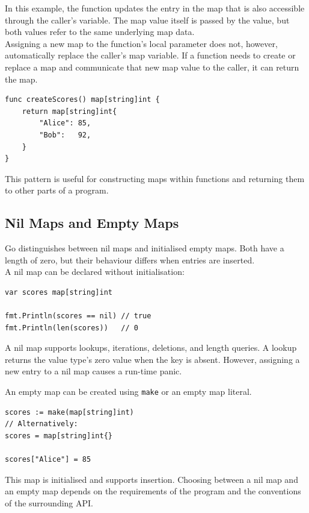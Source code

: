 In this example, the function updates the entry in the
map that is also accessible through the caller's variable.
The map value itself is passed by the value, but both values
refer to the same underlying map data.\\

Assigning a new map to the function's local parameter
does not, however, automatically replace the caller's
map variable. If a function needs to create or replace
a map and communicate that new map value to the caller,
it can return the map.

\begin{lstlisting}
func createScores() map[string]int {
    return map[string]int{
        "Alice": 85,
        "Bob":   92,
    }
}
\end{lstlisting}

This pattern is useful for constructing maps within
functions and returning them to other parts of a program.

\subsection{Nil Maps and Empty Maps}

Go distinguishes between nil maps and initialised empty
maps. Both have a length of zero, but their behaviour
differs when entries are inserted.\\

A nil map can be declared without initialisation:

\begin{lstlisting}
var scores map[string]int

fmt.Println(scores == nil) // true
fmt.Println(len(scores))   // 0
\end{lstlisting}

A nil map supports lookups, iterations, deletions, and
length queries. A lookup returns the value type's zero
value when the key is absent. However, assigning a new
entry to a nil map causes a run-time panic.

An empty map can be created using \texttt{make} or an
empty map literal.

\begin{lstlisting}
scores := make(map[string]int)
// Alternatively:
scores = map[string]int{}

scores["Alice"] = 85
\end{lstlisting}

This map is initialised and supports insertion. Choosing
between a nil map and an empty map depends on the
requirements of the program and the conventions of the
surrounding API.

